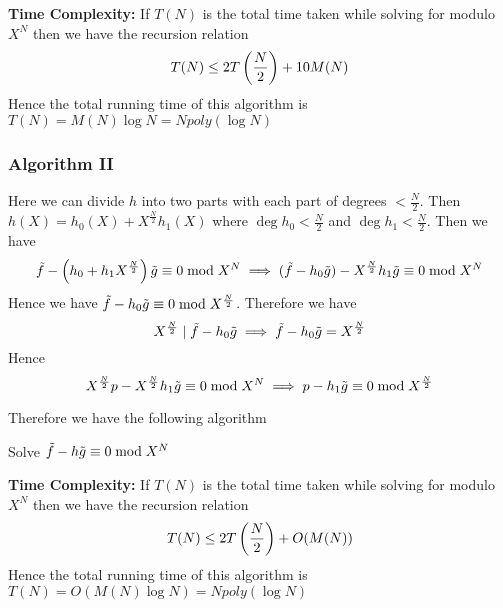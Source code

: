 \textbf{Time Complexity:} If $T(N)$ is the total time taken while solving for modulo $X^{N}$ then we have the recursion relation $$T(N)\leq 2T\left(\frac{N}2\right)+10M(N)$$Hence the total running time of this algorithm is $T(N)=M(N)\log N=Npoly(\log N)$\parinn
\subsubsection{Algorithm II}
Here we can divide $h$ into two parts with each part of degrees $< \frac{N}2$. Then $h(X)=h_0(X)+X^{\frac{N}2}h_1(X)$ where $\deg h_0<\frac{N}2$ and $\deg h_1<\frac{N}2$. Then we have 
$$
	\tilde{f}-\left(h_0+h_1X^{\frac{N}2}\right)\tilde{g}\equiv 0\bmod{X^N} \implies (\tilde{f}-h_0\tilde{g})-X^{\frac{N}2}h_1\tilde{g}\equiv 0 \bmod{X^N} $$Hence we have $\tilde{f}-h_0\tilde{g}\equiv 0\bmod{X^{\frac{N}2}}$. Therefore we have $$X^{\frac{N}2}\mid \tilde{f}-h_0\tilde{g}\implies \tilde{f}-h_0\tilde{g}=X^{\frac{N}2}$$ Hence $$X^{\frac{N}2}p-X^{\frac{N}2}h_1\tilde{g}\equiv 0\bmod{X^{N}}\implies p-h_1\tilde{g}\equiv 0\bmod{X^{\frac{N}2}}$$
	
	\newpage Therefore we have the following algorithm

\begin{algorithm}
	\DontPrintSemicolon
	\caption{Solve $\tilde{f}-h\tilde{g}\equiv 0\bmod {X^N}$}
\end{algorithm}\parinf\vspace{5mm}

\textbf{Time Complexity:} If $T(N)$ is the total time taken while solving for modulo $X^{N}$ then we have the recursion relation $$T(N)\leq 2T\left(\frac{N}2\right)+O(M(N))$$Hence the total running time of this algorithm is $T(N)=O(M(N)\log N)=Npoly(\log N)$\parinn